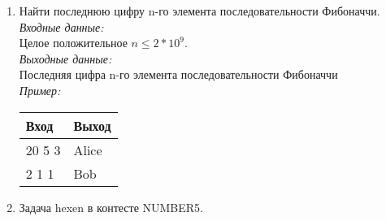 \documentclass[12pt]{article}
\begin{document}
\begin{enumerate}
\item Найти последнюю цифру n-го элемента последовательности Фибоначчи. \\
\null\hspace{1cm}\textit{Входные данные:} \\
\null\hspace{2cm} Целое положительное $n \le 2 * 10^9$. \\
\null\hspace{1cm} \textit{Выходные данные:} \\
\null\hspace{2cm} Последняя цифра n-го элемента последовательности Фибоначчи \\
\null\hspace{1cm} \textit{Пример:}
\begin{table}[h]
\centering
\begin{tabular}{|l|l|}
\hline
Вход & Выход                                                      \\ \hline
20 5 3  & Alice  \\ \hline
2 1 1  & Bob                                                        \\ \hline
\end{tabular}
\end{table}


\item Задача hexen в контесте NUMBER5.

\end{enumerate}
\end{document}
